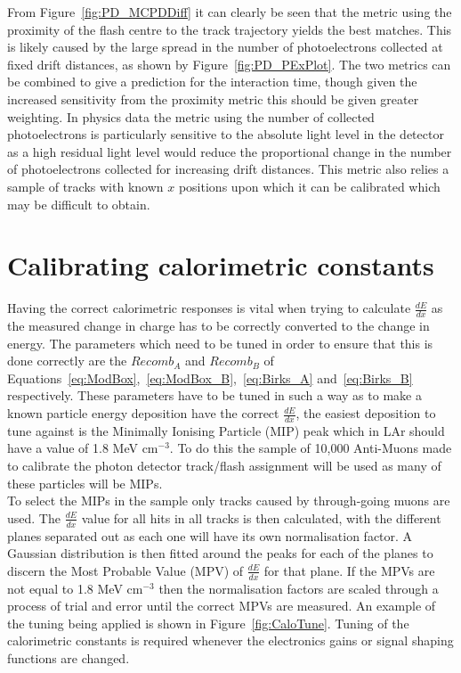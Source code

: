 From Figure~\ref{fig:PD_MCPDDiff} it can clearly be seen that the metric using the proximity of the flash centre to the track trajectory yields the best matches. This is likely caused by the large spread in the number of photoelectrons collected at fixed drift distances, as shown by Figure~\ref{fig:PD_PExPlot}. The two metrics can be combined to give a prediction for the interaction time, though given the increased sensitivity from the proximity metric this should be given greater weighting. In physics data the metric using the number of collected photoelectrons is particularly sensitive to the absolute light level in the detector as a high residual light level would reduce the proportional change in the number of photoelectrons collected for increasing drift distances. This metric also relies a sample of tracks with known $x$ positions upon which it can be calibrated which may be difficult to obtain. \\



\section{Calibrating calorimetric constants} \label{sec:MCCalib} %
Having the correct calorimetric responses is vital when trying to calculate $\frac{dE}{dx}$ as the measured change in charge has to be correctly converted to the change in energy. The parameters which need to be tuned in order to ensure that this is done correctly are the $Recomb_A$ and $Recomb_B$ of Equations~\ref{eq:ModBox},~\ref{eq:ModBox_B},~\ref{eq:Birks_A} and~\ref{eq:Birks_B} respectively. These parameters have to be tuned in such a way as to make a known particle energy deposition have the correct $\frac{dE}{dx}$, the easiest deposition to tune against is the Minimally Ionising Particle (MIP) peak which in LAr should have a value of 1.8 MeV cm$^{-3}$. To do this the sample of 10,000 Anti-Muons made to calibrate the photon detector track/flash assignment will be used as many of these particles will be MIPs. \\

To select the MIPs in the sample only tracks caused by through-going muons are used. The $\frac{dE}{dx}$ value for all hits in all tracks is then calculated, with the different planes separated out as each one will have its own normalisation factor. A Gaussian distribution is then fitted around the peaks for each of the planes to discern the Most Probable Value (MPV) of $\frac{dE}{dx}$ for that plane. If the MPVs are not equal to 1.8 MeV cm$^{-3}$ then the normalisation factors are scaled through a process of trial and error until the correct MPVs are measured. An example of the tuning being applied is shown in Figure~\ref{fig:CaloTune}. Tuning of the calorimetric constants is required whenever the electronics gains or signal shaping functions are changed.

